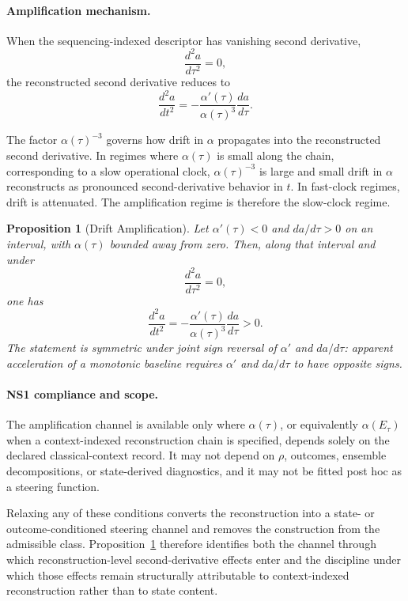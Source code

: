 \documentclass[aps,prx,onecolumn,11pt]{revtex4-2}
\theoremstyle{plain}
\newtheorem{proposition}{Proposition}
\theoremstyle{definition}
\theoremstyle{remark}
\begin{document}
\paragraph{Amplification mechanism.}

When the sequencing-indexed descriptor has vanishing second derivative,
\[
\frac{d^2 a}{d\tau^2}=0,
\]
the reconstructed second derivative reduces to
\begin{equation}
\frac{d^2 a}{dt^2}
=
-
\frac{\alpha'(\tau)}{\alpha(\tau)^3}
\frac{da}{d\tau}.
\label{eq:clock_drift_amplified_case}
\end{equation}

The factor \(\alpha(\tau)^{-3}\) governs how drift in \(\alpha\)
propagates into the reconstructed second derivative. In regimes where
\(\alpha(\tau)\) is small along the chain, corresponding to a slow
operational clock, \(\alpha(\tau)^{-3}\) is large and small drift in
\(\alpha\) reconstructs as pronounced second-derivative behavior in
\(t\). In fast-clock regimes, drift is attenuated. The amplification
regime is therefore the slow-clock regime.

\begin{proposition}[Drift Amplification]
\label{prop:drift_amplification}
Let \(\alpha'(\tau)<0\) and \(da/d\tau>0\) on an interval, with
\(\alpha(\tau)\) bounded away from zero. Then, along that interval and
under
\[
\frac{d^2 a}{d\tau^2}=0,
\]
one has
\begin{equation}
\frac{d^2 a}{dt^2}
=
-
\frac{\alpha'(\tau)}{\alpha(\tau)^3}
\frac{da}{d\tau}
>
0.
\end{equation}
The statement is symmetric under joint sign reversal of
\(\alpha'\) and \(da/d\tau\): apparent acceleration of a monotonic
baseline requires \(\alpha'\) and \(da/d\tau\) to have opposite signs.
\end{proposition}

\paragraph{NS1 compliance and scope.}

The amplification channel is available only where \(\alpha(\tau)\), or
equivalently \(\alpha(E_\tau)\) when a context-indexed reconstruction
chain is specified, depends solely on the declared classical-context
record. It may not depend on \(\rho\), outcomes, ensemble
decompositions, or state-derived diagnostics, and it may not be fitted
post hoc as a steering function.

Relaxing any of these conditions converts the reconstruction into a
state- or outcome-conditioned steering channel and removes the
construction from the admissible class. Proposition~\ref{prop:drift_amplification}
therefore identifies both the channel through which reconstruction-level
second-derivative effects enter and the discipline under which those
effects remain structurally attributable to context-indexed
reconstruction rather than to state content.
\end{document}
